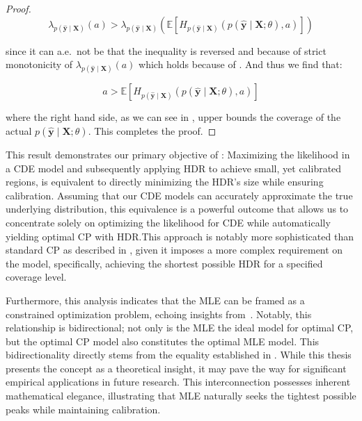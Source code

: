 \begin{proof}
    \begin{equation}
        \lambda_{p(\mathbf{\hat{y}}\mid\mathbf{X})}(a) > \lambda_{p(\mathbf{\hat{y}}\mid\mathbf{X})}\left(
        \mathbb{E}\left[H_{p(\hat{\mathbf{y}}\mid \mathbf{X})}(p(\mathbf{\hat{y}}\mid \mathbf{X};
                \theta), a)
                \right] \right)
    \end{equation}

    since it can a.e.\ not be that the inequality is reversed and because of strict monotonicity of $\lambda_{p(\mathbf{\hat{y}}\mid\mathbf{X})}(a)$ which holds because of . And thus we find that:

    \begin{equation}
        a > \mathbb{E}\left[H_{p(\hat{\mathbf{y}}\mid \mathbf{X})}(p(\mathbf{\hat{y}}\mid \mathbf{X};\theta), a)\right]
    \end{equation}

    where the right hand side, as we can see in , upper bounds the coverage of the actual $p(\mathbf{\hat{y}}\mid \mathbf{X};\theta)$. This completes the proof.

\end{proof}
This result demonstrates our primary objective of : Maximizing the likelihood in a CDE model and subsequently applying HDR to achieve small, yet calibrated regions, is equivalent to directly minimizing the HDR's size while ensuring calibration. Assuming that our CDE models can accurately approximate the true underlying distribution, this equivalence is a powerful outcome that allows us to concentrate solely on optimizing the likelihood for CDE while automatically yielding optimal CP with HDR.\@ This approach is notably more sophisticated than standard CP as described in , given it imposes a more complex requirement on the model, specifically, achieving the shortest possible HDR for a specified coverage level.

Furthermore, this analysis indicates that the MLE can be framed as a constrained optimization problem, echoing insights from~\cite{chung2021beyond}. Notably, this relationship is bidirectional; not only is the MLE the ideal model for optimal CP, but the optimal CP model also constitutes the optimal MLE model. This bidirectionality directly stems from the equality established in . While this thesis presents the concept as a theoretical insight, it may pave the way for significant empirical applications in future research. This interconnection possesses inherent mathematical elegance, illustrating that MLE naturally seeks the tightest possible peaks while maintaining calibration.

